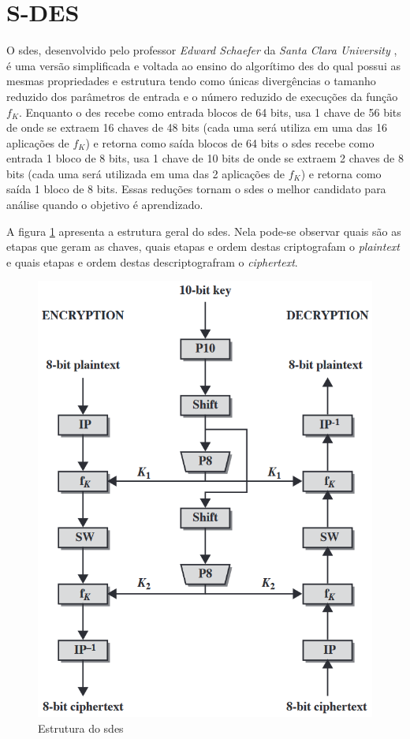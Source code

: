 \section{S-DES}
\label{sec:sdes}
O \acrfull{sdes}, desenvolvido pelo professor \textit{Edward Schaefer} da \textit{Santa Clara University} \cite{schaefer96}, é uma versão simplificada e voltada ao ensino do algorítimo \acrfull{des} do qual possui as mesmas propriedades e estrutura tendo como únicas divergências o tamanho reduzido dos parâmetros de entrada e o número reduzido de execuções da função \(f_K\). Enquanto o \acrshort{des} recebe como entrada blocos de 64 bits, usa 1 chave de 56 bits de onde se extraem 16 chaves de 48 bits (cada uma será utiliza em uma das 16 aplicações de \(f_K\)) e retorna como saída blocos de 64 bits o \acrshort{sdes} recebe como entrada 1 bloco de 8 bits, usa 1 chave de 10 bits de onde se extraem 2 chaves de 8 bits (cada uma será utilizada em uma das 2 aplicações de \(f_K\)) e retorna como saída 1 bloco de 8 bits. Essas reduções tornam o \acrshort{sdes} o melhor candidato para análise quando o objetivo é aprendizado. \cite{stallings10} \cite{stallings14}

A figura \ref{fig:sdesscheme} apresenta a estrutura geral do \acrshort{sdes}. Nela pode-se observar quais são as etapas que geram as chaves, quais etapas e ordem destas criptografam o \textit{plaintext} e quais etapas e ordem destas descriptografram o \textit{ciphertext}.

\begin{figure}[H]
    \centering
    \caption{Estrutura do \acrshort{sdes}}
    \label{fig:sdesscheme}
    \includegraphics[width=.5\linewidth]{Figuras/SDESScheme.png}
\end{figure}


